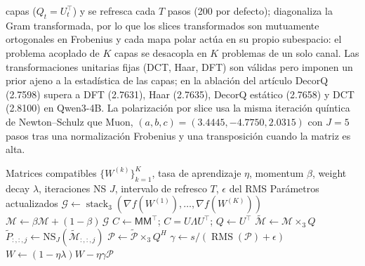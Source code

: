 capas ($Q_t = U_t^{\top}$) y se refresca cada $T$ pasos (200 por defecto); diagonaliza la
Gram transformada, por lo que los slices transformados son mutuamente ortogonales en
Frobenius y cada mapa polar actúa en su propio subespacio: el problema acoplado de $K$
capas se desacopla en $K$ problemas de un solo canal. Las transformaciones unitarias
fijas (DCT, Haar, DFT) son válidas pero imponen un prior ajeno a la estadística de las
capas; en la ablación del artículo DecorQ (2.7598) supera a DFT (2.7631), Haar (2.7635),
DecorQ estático (2.7658) y DCT (2.8100) en Qwen3-4B. La polarización por slice usa la
misma iteración quíntica de Newton--Schulz que Muon, $(a,b,c) = (3.4445, -4.7750,
2.0315)$ con $J = 5$ pasos tras una normalización Frobenius y una transposición cuando la
matriz es alta.

\begin{algorithm}[H]
\caption{TUON (Optimización Consciente de Tensores vía T-SVD y Polarización)}
\label{alg:tuon}
\begin{algorithmic}[1]
\Require Matrices compatibles $\{W^{(k)}\}_{k=1}^{K}$, tasa de aprendizaje $\eta$, momentum $\beta$, weight decay $\lambda$, iteraciones NS $J$, intervalo de refresco $T$, $\epsilon$ del RMS
\Ensure Parámetros actualizados
    \State $\mathcal{G} \gets \operatorname{stack}_3(\nabla f(W^{(1)}), \ldots, \nabla f(W^{(K)}))$ 
    \State $\mathcal{M} \gets \beta \mathcal{M} + (1-\beta)\, \mathcal{G}$ 
    \State $C \gets \mathsf{M}\mathsf{M}^{\top}$; $C = U \Lambda U^{\top}$; $Q \gets U^{\top}$ 
    \State $\widetilde{\mathcal{M}} \gets \mathcal{M} \times_3 Q$ 
        \State $\widetilde{P}_{:, :, j} \gets \mathrm{NS}_J(\widetilde{\mathcal{M}}_{:, :, j})$ 
    \EndFor
    \State $\mathcal{P} \gets \widetilde{\mathcal{P}} \times_3 Q^{H}$ 
    \State $\gamma \gets s / (\operatorname{RMS}(\mathcal{P}) + \epsilon)$ 
    \State $W \gets (1-\eta\lambda) W - \eta \gamma \mathcal{P}$ 
\EndFor
\end{algorithmic}
\end{algorithm}

